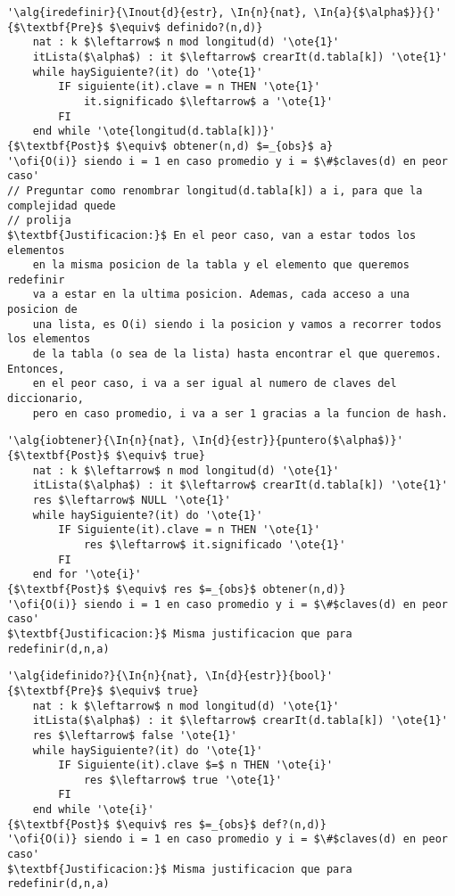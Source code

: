 \begin{lstlisting}[mathescape]
'\alg{iredefinir}{\Inout{d}{estr}, \In{n}{nat}, \In{a}{$\alpha$}}{}'
{$\textbf{Pre}$ $\equiv$ definido?(n,d)}
	nat : k $\leftarrow$ n mod longitud(d) '\ote{1}'
	itLista($\alpha$) : it $\leftarrow$ crearIt(d.tabla[k]) '\ote{1}'
	while haySiguiente?(it) do '\ote{1}'
		IF siguiente(it).clave = n THEN '\ote{1}'
			it.significado $\leftarrow$ a '\ote{1}'
		FI
	end while '\ote{longitud(d.tabla[k])}'
{$\textbf{Post}$ $\equiv$ obtener(n,d) $=_{obs}$ a}
'\ofi{O(i)} siendo i = 1 en caso promedio y i = $\#$claves(d) en peor caso'
// Preguntar como renombrar longitud(d.tabla[k]) a i, para que la complejidad quede
// prolija
$\textbf{Justificacion:}$ En el peor caso, van a estar todos los elementos
	en la misma posicion de la tabla y el elemento que queremos redefinir
	va a estar en la ultima posicion. Ademas, cada acceso a una posicion de
	una lista, es O(i) siendo i la posicion y vamos a recorrer todos los elementos
	de la tabla (o sea de la lista) hasta encontrar el que queremos. Entonces,
	en el peor caso, i va a ser igual al numero de claves del diccionario,
	pero en caso promedio, i va a ser 1 gracias a la funcion de hash.
\end{lstlisting}

\begin{lstlisting}[mathescape]
'\alg{iobtener}{\In{n}{nat}, \In{d}{estr}}{puntero($\alpha$)}'
{$\textbf{Post}$ $\equiv$ true}
	nat : k $\leftarrow$ n mod longitud(d) '\ote{1}'
	itLista($\alpha$) : it $\leftarrow$ crearIt(d.tabla[k]) '\ote{1}'
	res $\leftarrow$ NULL '\ote{1}'
	while haySiguiente?(it) do '\ote{1}'
		IF Siguiente(it).clave = n THEN '\ote{1}'
			res $\leftarrow$ it.significado '\ote{1}'
		FI
	end for '\ote{i}'
{$\textbf{Post}$ $\equiv$ res $=_{obs}$ obtener(n,d)}
'\ofi{O(i)} siendo i = 1 en caso promedio y i = $\#$claves(d) en peor caso'
$\textbf{Justificacion:}$ Misma justificacion que para redefinir(d,n,a)
\end{lstlisting}

\begin{lstlisting}[mathescape]
'\alg{idefinido?}{\In{n}{nat}, \In{d}{estr}}{bool}'
{$\textbf{Pre}$ $\equiv$ true}
	nat : k $\leftarrow$ n mod longitud(d) '\ote{1}'
	itLista($\alpha$) : it $\leftarrow$ crearIt(d.tabla[k]) '\ote{1}'
	res $\leftarrow$ false '\ote{1}'
	while haySiguiente?(it) do '\ote{1}'
		IF Siguiente(it).clave $=$ n THEN '\ote{i}'
			res $\leftarrow$ true '\ote{1}'
		FI
	end while '\ote{i}'
{$\textbf{Post}$ $\equiv$ res $=_{obs}$ def?(n,d)}
'\ofi{O(i)} siendo i = 1 en caso promedio y i = $\#$claves(d) en peor caso'
$\textbf{Justificacion:}$ Misma justificacion que para redefinir(d,n,a)
\end{lstlisting}

